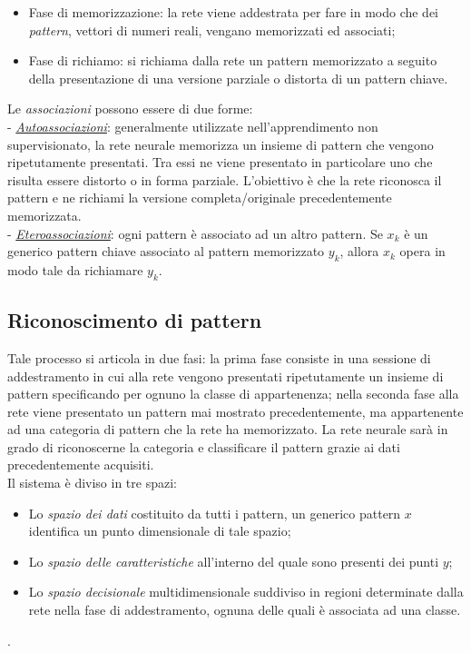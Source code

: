 \documentclass[12pt,a4paper,oneside]{book}
\begin{document}
		\begin{itemize}
		 \item Fase di memorizzazione: la rete viene addestrata per fare in modo che dei \emph{pattern}, vettori di numeri reali, vengano memorizzati ed associati;
		 \item Fase di richiamo: si richiama dalla rete un pattern memorizzato a seguito della presentazione di una versione parziale o distorta di un pattern chiave. 
		\end{itemize}
	
		Le \emph{associazioni} possono essere di due forme:\\ 
		- \underline{\emph{Autoassociazioni}}: generalmente utilizzate nell'apprendimento non supervisionato, la rete neurale memorizza un insieme di pattern che vengono ripetutamente presentati. Tra essi ne viene presentato in particolare uno che risulta essere distorto o in forma parziale. L'obiettivo è che la rete riconosca il pattern e ne richiami la versione completa/originale precedentemente memorizzata.\\
		-  \underline{\emph{Eteroassociazioni}}: ogni pattern è associato ad un altro pattern. Se $x_{k}$ è un generico pattern chiave associato al pattern memorizzato $y_{k}$, allora $x_{k}$ opera in modo tale da richiamare $y_{k}$.
		
		\subsection{Riconoscimento di pattern}
		
		Tale processo si articola in due fasi: la prima fase consiste in una sessione di addestramento in cui  alla rete vengono presentati ripetutamente un insieme di pattern specificando per ognuno la classe di appartenenza; nella seconda fase alla rete viene presentato un pattern mai mostrato precedentemente, ma appartenente ad una categoria di pattern che la rete ha memorizzato. La rete neurale sarà in grado di riconoscerne la categoria e classificare il pattern grazie ai dati precedentemente acquisiti.\\
		Il sistema è diviso in tre spazi:\\
		
		\begin{itemize}
		\item Lo \emph{spazio dei dati} costituito da tutti i pattern, un generico pattern $x$ identifica un punto dimensionale di tale spazio;
		\item Lo \emph{spazio delle caratteristiche} all'interno del quale sono presenti dei punti $y$;
		\item Lo \emph{spazio decisionale} multidimensionale suddiviso in regioni determinate dalla rete nella fase di addestramento, ognuna delle quali è associata ad una classe.
		\end{itemize}.
		
\end{document}
